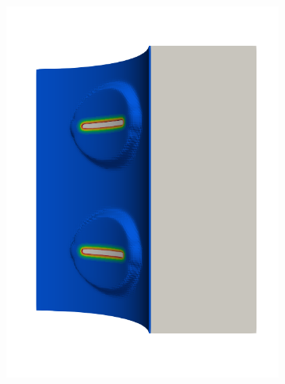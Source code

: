\begin{frame}
\begin{columns}[T]
\begin{column}{0.6\textwidth}
\begin{figure}
{\begin{subfigure}{0.19\textwidth}
            \includegraphics[width=\textwidth]{Chapter345/figures/seed_d_5}
          \end{subfigure}
          \hspace{0.06\textwidth}
          \begin{subfigure}{0.19\textwidth}
            \centering

\end{subfigure}}
\end{figure}
\end{column}
\end{columns}
\end{frame}
